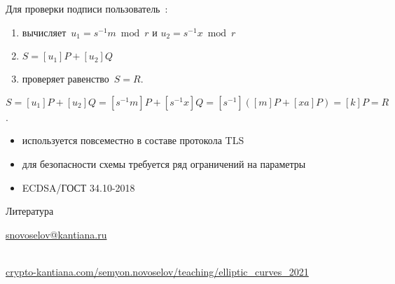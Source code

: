 \documentclass{beamer}
\begin{document}
\begin{frame}

Для проверки подписи пользователь~\structure{\faCat}:
\begin{enumerate}
	\item вычисляет~$u_1 = s^{-1} m \bmod{r}$ и $u_2 = s^{-1} x \bmod{r}$
	\item $S = [u_1] P + [u_2] Q$
	\item проверяет равенство~$S = R$.
\end{enumerate}

\vspace{1em}

\structure{$\triangleleft$}
$S = [u_1] P + [u_2] Q = [s^{-1} m] P + [s^{-1} x] Q = [s^{-1}] ([m] P + [x a] P) = [k] P = R$.
\structure{$\triangleright$}

\end{frame}

\begin{frame}{}
\begin{itemize}
	\item используется повсеместно в составе протокола TLS
	\item для безопасности схемы требуется ряд ограничений на параметры
	\item ECDSA/ГОСТ 34.10-2018
\end{itemize}
\end{frame}


\begin{frame}{Литература}
\nocite{Menezes1993}\nocite{Blake1999}\nocite{Washington2008}

\printbibliography


\begin{center}
    \begin{tcolorbox}[enhanced,hbox,colback=block-green-color-bg,colframe=subsection-color!120,title=Контакты,center title]
        \begin{varwidth}{\textwidth}
            \begin{center}
                \href{mailto:snovoselov@kantiana.ru}{snovoselov@kantiana.ru}
            \end{center}
        \end{varwidth}
    \end{tcolorbox}	
\end{center}

\\
{\footnotesize
    \href{https://crypto-kantiana.com/semyon.novoselov/teaching/elliptic_curves_2021}{crypto-kantiana.com/semyon.novoselov/teaching/elliptic\_curves\_2021}
}
\end{frame}
\end{document}
